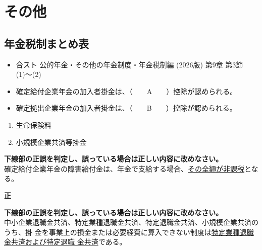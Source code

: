 \section{その他}

\subsection{年金税制まとめ表}

\begin{InyouJobunbox}
  \begin{itemize}
    \item 合スト 公的年金・その他の年金制度・年金税制編 (2026版) 第9章 第3節(1)〜(2)
  \end{itemize}
\end{InyouJobunbox}

\begin{fillblank}[数理人試験 2024 問題6 設問3]
  \begin{itemize}
    \item 確定給付企業年金の加入者掛金は、（　　A　　）控除が認められる。
    \item 確定拠出企業年金の加入者掛金は、（　　B　　）控除が認められる。
  \end{itemize}
\end{fillblank}

\begin{answerbox}
  \begin{enumerate}[A:]
    \item 生命保険料
    \item 小規模企業共済等掛金
  \end{enumerate}
\end{answerbox}

\begin{truefalse}[年金1 2018 問題1(3)\textcircled{1}]
\textbf{下線部の正誤を判定し、誤っている場合は正しい内容に改めなさい。}
\\  

  確定給付企業年金の障害給付金は、年金で支給する場合、\underline{その全額が非課税}となる。
\end{truefalse}

\begin{answerbox}
  \textbf{正}
\end{answerbox}

\begin{truefalse}[年金1 2018 問題1(3)\textcircled{2}]
\textbf{下線部の正誤を判定し、誤っている場合は正しい内容に改めなさい。}
\\  

中小企業退職金共済、特定業種退職金共済、特定退職金共済、小規模企業共済のうち、掛
金を事業上の損金または必要経費に算入できない制度は\underline{特定業種退職金共済および特定退職
金共済}である。
\end{truefalse}

